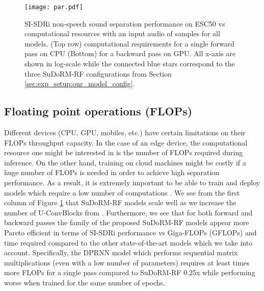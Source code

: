 \documentclass{article}
\theoremstyle{definition}
\newcommand{\sudo}{SuDoRM-RF }
\newcommand{\sudos}{SuDoRM-RF 0.25x }
\begin{document}
\begin{figure}[!t]
    \centering
      \texttt{[image: par.pdf]}
      \caption{SI-SDRi non-speech sound separation performance on ESC50 vs computational resources with an input audio of  samples for all models. (Top row) computational requirements for a single forward pass on CPU (Bottom) for a backward pass on GPU. All x-axis are shown in log-scale while the  connected blue stars correspond to the three \sudo configurations from Section \ref{sec:exp_setup:our_model_config}.}
      \label{fig:pareto}
    \vspace{-5pt}
\end{figure}




\subsection{Floating point operations (FLOPs)}
Different devices (CPU, GPU, mobiles, etc.) have certain limitations on their FLOPs throughput capacity. In the case of an edge device, the computational resource one might be interested in is the number of FLOPs required during inference. On the other hand, training on cloud machines might be costly if a huge number of FLOPs is needed in order to achieve high separation performance. As a result, it is extremely important to be able to train and deploy models which require a low number of computations \cite{howard2017mobilenets}. We see from the first column of Figure \ref{fig:pareto} that \sudo models scale well as we increase the number of U-ConvBlocks  from . Furthermore, we see that for both forward and backward passes the family of the proposed \sudo models appear more Pareto efficient in terms of SI-SDRi performance vs Giga-FLOPs (GFLOPs) and time required compared to the other state-of-the-art models which we take into account. Specifically, the DPRNN model \cite{luo2019dual} which performs sequential matrix multiplications (even with a low number of parameters) requires at least  times more FLOPs for a single pass compared to \sudos while performing worse when trained for the same number of epochs.
\end{document}
